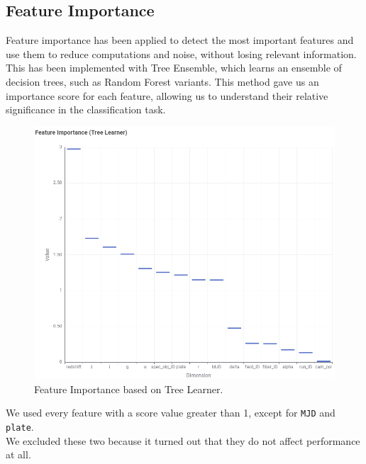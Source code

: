 \subsection{Feature Importance}
Feature importance has been applied to detect the most important features and use them to reduce computations and noise, without losing relevant information. This has been implemented with Tree Ensemble, which learns an ensemble of decision trees, such as Random Forest variants. This method gave us an importance score for each feature, allowing us to understand their relative significance in the classification task.   
\begin{figure}[H]
    \centering
    \includegraphics[width=1\columnwidth]{images/Feature Importance.png}
    \caption{Feature Importance based on Tree Learner.}
    \label{fig:fig2}
\end{figure}
We used every feature with a score value greater than 1, except for \texttt{MJD} and \texttt{plate}.\\We excluded these two because it turned out that they do not affect performance at all.